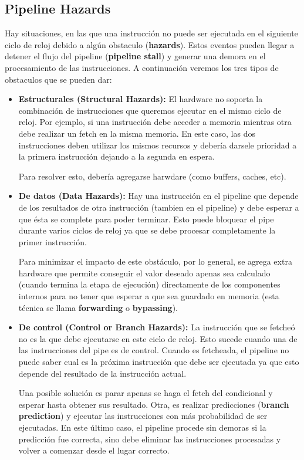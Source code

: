 \subsection{Pipeline Hazards}
Hay situaciones, en las que una instrucción no puede ser ejecutada en el siguiente ciclo de reloj debido a algún obstaculo (\textbf{hazards}). Estos eventos pueden llegar a detener el flujo del pipeline (\textbf{pipeline stall}) y generar una demora en el procesamiento de las instrucciones. A continuación veremos los tres tipos de obstaculos que se pueden dar:

\begin{itemize}
	\item \textbf{Estructurales (Structural Hazards):} El hardware no soporta la combinación de instrucciones que queremos ejecutar en el mismo ciclo de reloj. Por ejemplo, si una instrucción debe acceder a memoria mientras otra debe realizar un fetch en la misma memoria. En este caso, las dos instrucciones deben utilizar los mismos recursos y debería darsele prioridad a la primera instrucción dejando a la segunda en espera.
	
	Para resolver esto, debería agregarse harwdare (como buffers, caches, etc).
	\item \textbf{De datos (Data Hazards):} Hay una instrucción en el pipeline que depende de los resultados de otra instrucción (tambien en el pipeline) y debe esperar a que ésta se complete para poder terminar. Esto puede bloquear el pipe durante varios ciclos de reloj ya que se debe procesar completamente la primer instrucción. 
	
	Para minimizar el impacto de este obstáculo, por lo general, se agrega extra hardware que permite conseguir el valor deseado apenas sea calculado (cuando termina la etapa de ejecución) directamente de los componentes internos para no tener que esperar a que sea guardado en memoria (esta técnica se llama \textbf{forwarding} o \textbf{bypassing}).
	\item \textbf{De control (Control or Branch Hazards):} La instrucción que se fetcheó no es la que debe ejecutarse en este ciclo de reloj. Esto sucede cuando una de las instrucciones del pipe es de control. Cuando es fetcheada, el pipeline no puede saber cual es la próxima instrucción que debe ser ejecutada ya que esto depende del resultado de la instrucción actual.
	
	Una posible solución es parar apenas se haga el fetch del condicional y esperar hasta obtener sus resultado. Otra, es realizar predicciones (\textbf{branch prediction}) y ejecutar las instrucciones con más probabilidad de ser ejecutadas. En este último caso, el pipeline procede sin demoras si la predicción fue correcta, sino debe eliminar las instrucciones procesadas y volver a comenzar desde el lugar correcto.
\end{itemize}

